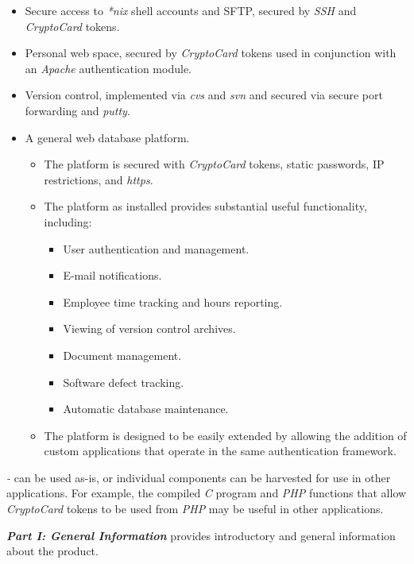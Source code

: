 \begin{itemize}
\item Secure access to \emph{*nix} shell accounts and
      SFTP, secured by \emph{SSH} and \emph{CryptoCard} tokens.
\item Personal web space, secured by \emph{CryptoCard} tokens
      used in conjunction with an \emph{Apache} authentication
      module.
\item Version control, implemented via 
      \emph{cvs} and \emph{svn} and secured
      via secure port forwarding and
      \emph{putty}.
\item A general web database platform.

   \begin{itemize}
   \item The platform is secured with \emph{CryptoCard} tokens,
         static passwords, IP restrictions, and \emph{https}.
   \item The platform as installed provides substantial
         useful functionality, including:

         \begin{itemize}
         \item User authentication and management.
         \item E-mail notifications.
         \item Employee time tracking and hours reporting.
         \item Viewing of version control archives.
         \item Document management.
         \item Software defect tracking.
         \item Automatic database maintenance.
         \end{itemize}

   \item The platform is designed to be easily extended by allowing
         the addition of custom applications that operate in the same
         authentication framework.
   \end{itemize}
\end{itemize}

\emph{\productbasename{}-\productversion{}} can be used as-is, or individual
components can be harvested for use in other applications.  For example,
the compiled \emph{C} program and \emph{PHP} functions that allow \emph{CryptoCard} tokens
to be used from \emph{PHP} may be useful in other applications.

\emph{\textbf{Part I: General Information}} provides introductory
and general information about the product.

